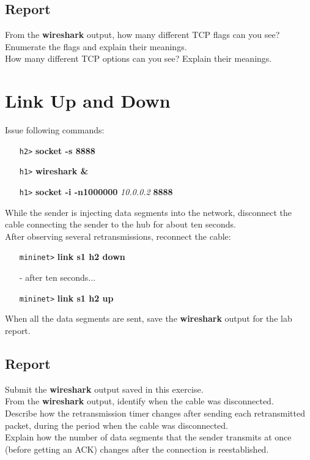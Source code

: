 \documentclass[10pt,a4paper]{article}
\numberwithin{equation}{section}
\numberwithin{figure}{section}
\numberwithin{table}{section}
\begin{document}
    \subsection*{Report}
    From the \textbf{wireshark} output, how many different TCP flags can you see? Enumerate the flags and explain their meanings. \\
    How many different TCP options can you see?
    Explain their meanings.

\section*{Link Up and Down}
    Issue following commands:
    \begin{itemize}
    	\item [\texttt{h2>}] \textbf{socket -s 8888}
    	\item [\texttt{h1>}] \textbf{wireshark \&}
    	\item [\texttt{h1>}] \textbf{socket -i -n1000000} \textit{10.0.0.2} \textbf{8888}
    \end{itemize}
    While the sender is injecting data segments into the network, disconnect the cable connecting the sender to the hub for about ten seconds. \\
    After observing several retransmissions, reconnect the cable:
    \begin{itemize}
    	\setlength{\itemindent}{30pt}
        \item [\texttt{mininet>}] \textbf{link s1 h2 down}
        \item [-] after ten seconds...
        \item [\texttt{mininet>}] \textbf{link s1 h2 up}
    \end{itemize}
    When all the data segments are sent, save the \textbf{wireshark} output for the lab report.
    \subsection*{Report}
    Submit the \textbf{wireshark} output saved in this exercise. \\
    From the \textbf{wireshark} output, identify when the cable was disconnected. \\
    Describe how the retransmission timer changes after sending each retransmitted packet, during the period when the cable was disconnected. \\
    Explain how the number of data segments that the sender transmits at once (before getting an ACK) changes after the connection is reestablished.
\end{document}

